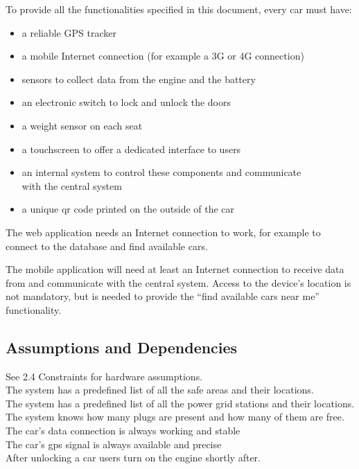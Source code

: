 \documentclass[english]{article}
\begin{document}
To provide all the functionalities specified in this document, every car must have:
\begin{itemize}
	\item{a reliable GPS tracker}
	\item{a mobile Internet connection (for example a 3G or 4G connection)}
	\item{sensors to collect data from the engine and the battery}
	\item{an electronic switch to lock and unlock the doors}
	\item{a weight sensor on each seat}
	\item{a touchscreen to offer a dedicated interface to users}
	\item{an internal system to control these components and communicate\\ with the central system}
	\item{a unique qr code printed on the outside of the car}
\end{itemize}

The web application needs an Internet connection to work, for example to connect to the database and find available cars.

The mobile application will need at least an Internet connection to receive data from and communicate with the central system. Access to the device’s location is not mandatory, but is needed to provide the “find available cars near me” functionality.

\subsection{Assumptions and Dependencies}

See 2.4 Constraints for hardware assumptions.\\


The system has a predefined list of all the safe areas and their locations.\\
The system has a predefined list of all the power grid stations and their locations.\\
The system knows how many plugs are present and how many of them are free.\\


The car’s data connection is always working and stable\\
The car’s gps signal is always available and precise\\


After unlocking a car users turn on the engine shortly after.\\
\end{document}
